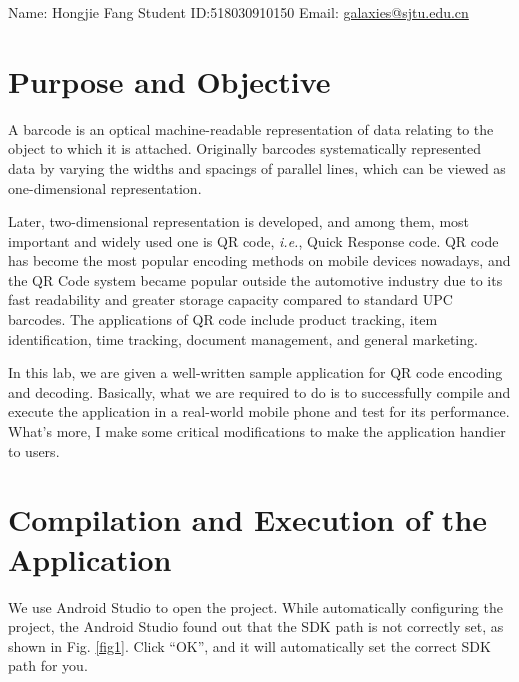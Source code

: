 \documentclass[12pt, a4paper]{article}
\theoremstyle{definition}
\begin{document}
\noindent

\noindent{}
\begin{center}

Name: Hongjie Fang  \quad Student ID:518030910150 \quad Email: \href{mailto:galaxies@sjtu.edu.cn}{galaxies@sjtu.edu.cn}
\end{center}

\section{Purpose and Objective}\label{section1}
A barcode is an optical machine-readable representation of data relating to the object to which it is attached. Originally barcodes systematically represented data by varying the widths and spacings of parallel lines, which can be viewed as one-dimensional representation. 

Later, two-dimensional representation is developed, and among them, most important and widely used one is QR code, \textit{i.e.}, Quick Response code. QR code has become the most popular encoding methods on mobile devices nowadays, and the QR Code system became popular outside the automotive industry due to its fast readability and greater storage capacity compared to standard UPC barcodes. The applications of QR code include product tracking, item identification, time tracking, document
management, and general marketing.

In this lab, we are given a well-written sample application for QR code encoding and decoding. Basically, what we are required to do is to successfully compile and execute the application in a real-world mobile phone and test for its performance. What's more, I make some critical modifications to make the application handier to users.

\section{Compilation and Execution of the Application}
We use Android Studio to open the project. While automatically configuring the project, the Android Studio found out that the SDK path is not correctly set, as shown in Fig. \ref{fig1}. Click ``OK'', and it will automatically set the correct SDK path for you.
\end{document}
